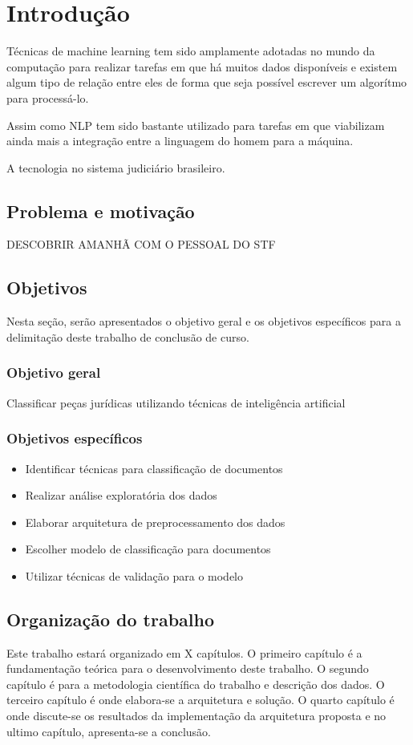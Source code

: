 \chapter[Introdução]{Introdução}

Técnicas de machine learning tem sido amplamente adotadas no mundo da computação para realizar tarefas em que há muitos dados disponíveis e existem algum tipo de relação entre eles de forma que seja possível escrever um algorítmo para processá-lo.

Assim como NLP tem sido bastante utilizado para tarefas em que viabilizam ainda mais a integração entre a linguagem do homem para a máquina.

A tecnologia no sistema judiciário brasileiro.

\section{Problema e motivação}

DESCOBRIR AMANHÃ COM O PESSOAL DO STF

\section{Objetivos}
Nesta seção, serão apresentados o objetivo geral e os objetivos específicos para a delimitação deste trabalho de conclusão de curso.

\subsection{Objetivo geral}

Classificar peças jurídicas utilizando técnicas de inteligência artificial

\subsection{Objetivos específicos}    

\begin{itemize}
  \item Identificar técnicas para classificação de documentos
  \item Realizar análise exploratória dos dados
  \item Elaborar arquitetura de preprocessamento dos dados
  \item Escolher modelo de classificação para documentos
  \item Utilizar técnicas de validação para o modelo
\end{itemize}

\section{Organização do trabalho}
	Este trabalho estará organizado em X capítulos. O primeiro capítulo é a fundamentação teórica para o desenvolvimento deste trabalho. O segundo capítulo é para a metodologia científica do trabalho e descrição dos dados. O terceiro capítulo é onde elabora-se a arquitetura e solução. O quarto capítulo é onde discute-se os resultados da implementação da arquitetura proposta e no ultimo capítulo, apresenta-se a conclusão.